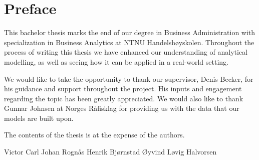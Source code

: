 \section*{Preface}

This bachelor thesis marks the end of our degree in Business Administration with specialization in Business Analytics at NTNU Handelshøyskolen. Throughout the process of writing this thesis we have enhanced our understanding of analytical modelling, as well as seeing how it can be applied in a real-world setting. 

We would like to take the opportunity to thank our supervisor, Denis Becker, for his guidance and support throughout the project. His inputs and engagement regarding the topic has been greatly appreciated. We would also like to thank Gunnar Johnsen at Norges Råfisklag for providing us with the data that our models are built upon.    

The contents of the thesis is at the expense of the authors. 

\vspace{5cm}

\begin{Form}
    \begin{spacing}{0.8}
    \begin{center}
        \noindent\makebox[\linewidth]{\rule{0.8\textwidth}{0pt}}
        \noindent\makebox[\linewidth]{\rule{0.8\textwidth}{0.4pt}}
        Victor Carl Johan Rognås
        \noindent\makebox[\linewidth]{\rule{0.8\textwidth}{0.4pt}}
        Henrik Bjørnstad
        \noindent\makebox[\linewidth]{\rule{0.8\textwidth}{0.4pt}}
        Øyvind Løvig Halvorsen
    \end{center}
    \end{spacing}
\end{Form}